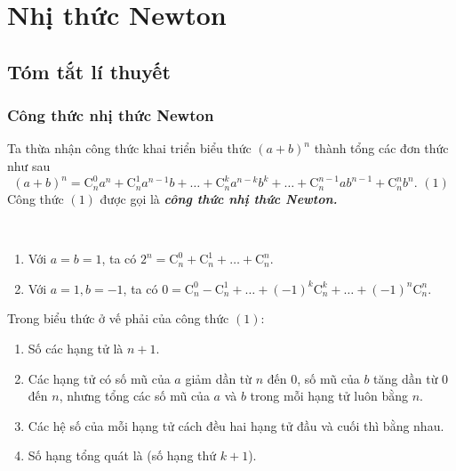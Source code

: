 \section{Nhị thức Newton}
\subsection{Tóm tắt lí thuyết}
\subsubsection{Công thức nhị thức Newton}
\begin{dn}
Ta thừa nhận công thức khai triển biểu thức $\left(a+b\right)^n$ thành tổng các đơn thức như sau
$$\left(a+b\right)^n = \mathrm{C}_n^0a^n+\mathrm{C}_n^1a^{n-1}b+\ldots+\mathrm{C}_n^ka^{n-k}b^k+\ldots+\mathrm{C}_n^{n-1}ab^{n-1}+\mathrm{C}_n^nb^n.\,\, (1)$$
Công thức $(1)$ được gọi là \textbf{\textit{công thức nhị thức Newton.}}
\end{dn}
\begin{hq} \
\begin{enumerate}
    \item Với $a=b=1$, ta có $2^n=\mathrm{C}_n^0+\mathrm{C}_n^1+\ldots+\mathrm{C}_n^n$.
    \item Với $a=1, b=-1$, ta có $0=\mathrm{C}_n^0-\mathrm{C}_n^1+\ldots+(-1)^k\mathrm{C}_n^k+\ldots+(-1)^n\mathrm{C}_n^n.$
\end{enumerate}
\end{hq}
\begin{note}
Trong biểu thức ở vế phải của công thức $(1)$:
\begin{enumerate}
\item Số các hạng tử là $n+1$.
\item Các hạng tử có số mũ của $a$ giảm dần từ $n$ đến $0$, số mũ của $b$ tăng dần từ $0$ đến $n$, nhưng tổng các số mũ của $a$ và $b$ trong mỗi hạng tử luôn bằng $n$.
\item Các hệ số của mỗi hạng tử cách đều hai hạng tử đầu và cuối thì bằng nhau.
\item Số hạng tổng quát là \fbox{$T_{k+1}=\mathrm{C}_n^ka^{n-k}b^k$} (số hạng thứ $k+1$).
\end{enumerate}
\end{note}
